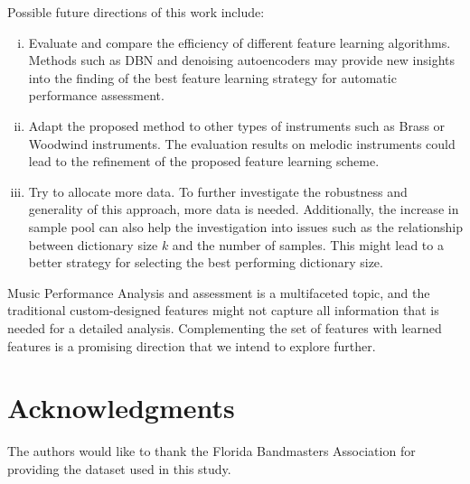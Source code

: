 \documentclass{ws-ijsc}
\begin{document}
Possible future directions of this work include: 
\begin{enumerate}[(i)]
    \item   Evaluate and compare the efficiency of different feature learning algorithms. Methods such as DBN\cite{Hamel2010} and denoising autoencoders \cite{Vincent2008} may provide new insights into the finding of the best feature learning strategy for automatic performance assessment.
    \item   Adapt the proposed method to other types of instruments such as Brass or Woodwind instruments. The evaluation results on melodic instruments could lead to the refinement of the proposed feature learning scheme. 
    \item   Try to allocate more data. To further investigate the robustness and generality of this approach, more data is needed. Additionally, the increase in sample pool can also help the investigation into issues such as the relationship between dictionary size $k$ and the number of samples. This might lead to a better strategy for selecting the best performing dictionary size. 
\end{enumerate}

Music Performance Analysis and assessment is a multifaceted topic, and the traditional custom-designed features might not capture all information that is needed for a detailed analysis. Complementing the set of features with learned features is a promising direction that we intend to explore further.



\section*{Acknowledgments}

The authors would like to thank the Florida Bandmasters Association for providing the dataset used in this study.



%
%
%



\end{document}

